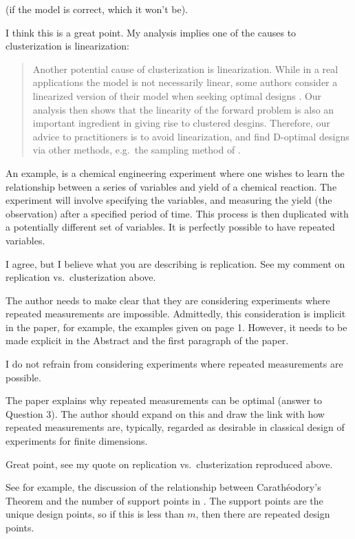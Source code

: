 \RC (if the model is correct, which it won’t be).

\AR I think this is a great point. My analysis implies one of the
causes to clusterization is linearization:
\begin{quote} %
Another potential cause of clusterization is linearization. While in a
real applications the model is not necessarily linear, some authors
consider a linearized version of their model when seeking optimal
designs \cite{fedorov1996, neitzel2019sparse}. Our analysis then shows
that the linearity of the forward problem is also an important
ingredient in giving rise to clustered desgins. Therefore, our advice
to practitioners is to avoid linearization, and find D-optimal designs
via other methods, e.g.~the sampling method of \cite{ryan2003}.
\end{quote}


\RC An example, is a chemical engineering experiment where one wishes
to learn the relationship between a series of variables and yield of a
chemical reaction. The experiment will involve specifying the
variables, and measuring the yield (the observation) after a specified
period of time. This process is then duplicated with a potentially
different set of variables. It is perfectly possible to have repeated
variables.

\AR I agree, but I believe what you are describing is replication. See
my comment on replication vs.~clusterization above.
 
\RC The author needs to make clear that they are considering
experiments where repeated measurements are impossible. Admittedly,
this consideration is implicit in the paper, for example, the examples
given on page 1. However, it needs to be made explicit in the Abstract
and the first paragraph of the paper.

\AR I do not refrain from considering experiments where repeated
measurements are possible.

  
\RC The paper explains why repeated measurements can be optimal
(answer to Question 3). The author should expand on this and draw the
link with how repeated measurements are, typically, regarded as
desirable in classical design of experiments for finite
dimensions.

\AR Great point, see my quote on replication vs.~clusterization
reproduced above.

\RC See for example, the discussion of the relationship between
Carath\'eodory’s Theorem and the number of support points in \cite[page
  139]{pronzatoPazman2013}. The support points are the unique design
points, so if this is less than $m$, then there are repeated design
points.
  
